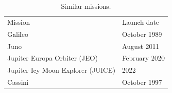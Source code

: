 












\begin{longtable}{ll}
  \caption{Similar missions.} \\

  Mission & Launch date \\

  Galileo & October 1989 \\

  Juno & August 2011 \\

  Jupiter Europa Orbiter (JEO) & February 2020 \\

  Jupiter Icy Moon Explorer (JUICE) & 2022 \\

  Cassini & October 1997 \\
\end{longtable}

